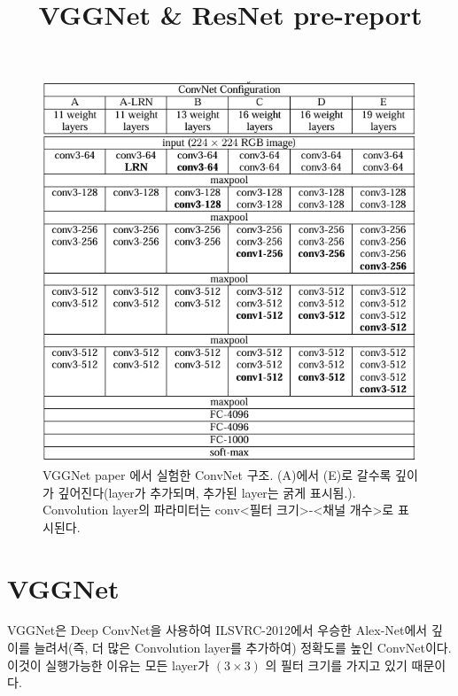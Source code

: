 \documentclass[extendedabs]{bmvc2k}
\begin{document}
\title{VGGNet \& ResNet pre-report}


 
\maketitle
\noindent

\begin{figure}[t]
	\includegraphics[width=\linewidth]{images/vggnet.PNG}
	\caption{VGGNet paper\cite{simonyan2015deepconvolutionalnetworkslargescale} 에서 실험한 ConvNet 구조. (A)에서 (E)로 갈수록 깊이가 깊어진다(layer가 추가되며, 추가된 layer는 굵게 표시됨.). Convolution layer의 파라미터는 conv<필터 크기>-<채널 개수>로 표시된다.}
 \label{fig:VGGNet}
	\vspace{-2mm}
\end{figure}
\section{VGGNet}
VGGNet\cite{simonyan2015deepconvolutionalnetworkslargescale}은 Deep ConvNet을 사용하여 ILSVRC-2012에서 우승한 Alex-Net\cite{AlexNet}에서 깊이를 늘려서(즉, 더 많은 Convolution layer를 추가하여) 정확도를 높인 ConvNet이다. 이것이 실행가능한 이유는 모든 layer가 $(3 \times 3)$ 의 필터 크기를 가지고 있기 때문이다.
\end{document}

